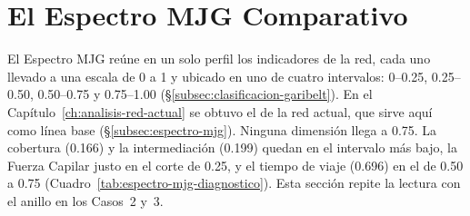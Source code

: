 %
%
\section{El Espectro MJG Comparativo}
\label{sec:anillo-espectro}

El Espectro MJG reúne en un solo perfil los indicadores de la red, cada uno
llevado a una escala de 0 a 1 y ubicado en uno de cuatro intervalos: 0--0.25,
0.25--0.50, 0.50--0.75 y 0.75--1.00 (§\ref{subsec:clasificacion-garibelt}).
En el Capítulo~\ref{ch:analisis-red-actual} se obtuvo el de la red actual, que
sirve aquí como línea base (§\ref{subsec:espectro-mjg}). Ninguna dimensión llega
a 0.75. La cobertura (0.166) y la intermediación (0.199) quedan en el intervalo
más bajo, la Fuerza Capilar justo en el corte de 0.25, y el tiempo de viaje
(0.696) en el de 0.50 a 0.75 (Cuadro~\ref{tab:espectro-mjg-diagnostico}). Esta
sección repite la lectura con el anillo en los Casos~2 y~3.

